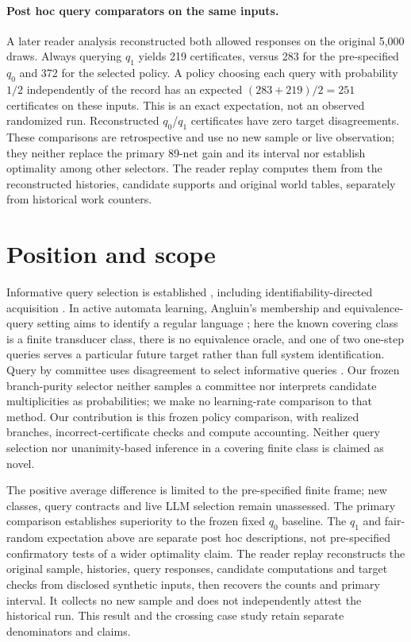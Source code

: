 \paragraph{Post hoc query comparators on the same inputs.}
A later reader analysis reconstructed both allowed responses on the original
5,000 draws. Always querying $q_1$ yields 219 certificates, versus 283 for
the pre-specified $q_0$ and 372 for the selected policy. A policy choosing
each query with probability $1/2$ independently of the record has an expected
$(283+219)/2=251$ certificates on these inputs. This is an exact expectation,
not an observed randomized run. Reconstructed $q_0$/$q_1$ certificates have
zero target disagreements. These comparisons are retrospective and use no
new sample or live observation; they neither replace the primary 89-net
gain and its interval nor establish optimality among other selectors.
The reader replay computes them from the reconstructed histories, candidate
supports and original world tables, separately from historical work counters.

\section{Position and scope}
Informative query selection is established \citep{cohn1994active}, including
identifiability-directed acquisition \citep{shetty2026idea}. In active automata
learning, Angluin's membership and equivalence-query setting aims to identify
a regular language \citep{angluin1987learning}; here the known covering class
is a finite transducer class, there is no equivalence oracle, and one of two
one-step queries serves a particular future target rather than full system
identification. Query by committee uses disagreement to select informative
queries \citep{seung1992query}. Our frozen branch-purity selector neither
samples a committee nor interprets candidate multiplicities as probabilities;
we make no learning-rate comparison to that method. Our contribution
is this frozen policy comparison, with realized branches, incorrect-certificate
checks and compute accounting. Neither query selection nor unanimity-based
inference in a covering finite class is claimed as novel.

The positive average difference is limited to the pre-specified finite frame;
new classes, query contracts and live LLM selection remain unassessed. The
primary comparison establishes superiority to the frozen fixed $q_0$
baseline. The $q_1$ and fair-random expectation above are separate post hoc
descriptions, not pre-specified confirmatory tests of a wider optimality claim.
The reader replay reconstructs the original sample, histories, query responses,
candidate computations and target checks from disclosed synthetic inputs,
then recovers the counts and primary interval. It collects no new sample
and does not independently attest the historical run. This result and the crossing
case study retain separate denominators and claims.
